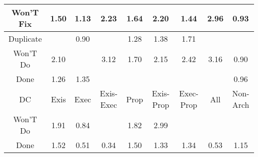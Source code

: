 \begin{tabular}{|c||c|c|c|c|c|c|c|c|}
\hline
Won'T Fix & \cellcolor[rgb]{0.8626152040378293,0.8175545703337086,0.42} 1.50 & \cellcolor[rgb]{0.8981264716371543,0.8343756970912837,0.42} 1.13 & \cellcolor[rgb]{0.7937341506108371,0.7849267029209228,0.42} 2.23 & \cellcolor[rgb]{0.8497795487605757,0.8114745230971148,0.42} 1.64 & \cellcolor[rgb]{0.7970508160686863,0.786497754979904,0.42} 2.20 & \cellcolor[rgb]{0.8685412676959272,0.8203616531191233,0.42} 1.44 & \cellcolor[rgb]{0.7251477189017987,0.75243839316401,0.42} 2.96 & \cellcolor[rgb]{0.8982838036636152,0.784543337341111,0.409064883419374} 0.93 \\ 
\hline
Duplicate &  & \cellcolor[rgb]{0.893262899184106,0.7607777228047677,0.40437870590516545} 0.90 &  & \cellcolor[rgb]{0.8832128190959656,0.8273113353612468,0.42} 1.28 & \cellcolor[rgb]{0.8737400008040134,0.8228242109071642,0.42} 1.38 & \cellcolor[rgb]{0.8427819699847852,0.8081598805191088,0.42000000000000004} 1.71 &  &  \\ 
\hline
Won'T Do & \cellcolor[rgb]{0.8064286249806552,0.7909398749908367,0.42000000000000004} 2.10 &  & \cellcolor[rgb]{0.7100272230802143,0.7452760530379963,0.42} 3.12 & \cellcolor[rgb]{0.8439091895400868,0.8086938266242516,0.42000000000000004} 1.70 & \cellcolor[rgb]{0.8016442509726989,0.7886735925660152,0.42} 2.15 & \cellcolor[rgb]{0.7765159175343297,0.7767706977794193,0.42} 2.42 & \cellcolor[rgb]{0.7062637894664907,0.7434933739578115,0.42} 3.16 & \cellcolor[rgb]{0.8922021409077528,0.7557568002966969,0.403388664847236} 0.90 \\ 
\hline
Done & \cellcolor[rgb]{0.8856098013123442,0.8284467479900577,0.42} 1.26 & \cellcolor[rgb]{0.876859469799226,0.8243018541154228,0.42} 1.35 &  &  &  &  &  & \cellcolor[rgb]{0.902413659632982,0.8040913222627818,0.41291941565744994} 0.96 \\ 
\hline
\hline
DC & Exis & Exec & Exis-Exec & Prop & Exis-Prop & Exec-Prop & All & Non-Arch \\ 
\hline
Won'T Do & \cellcolor[rgb]{0.8244058875115728,0.7994554204002188,0.42} 1.91 & \cellcolor[rgb]{0.8815205462696023,0.7051972523427839,0.3934191765182954} 0.84 &  & \cellcolor[rgb]{0.8325243302209373,0.8033009985257071,0.42000000000000004} 1.82 & \cellcolor[rgb]{0.7220792864300742,0.7509849251510878,0.42} 2.99 &  &  &  \\ 
\hline
Done & \cellcolor[rgb]{0.8610593907620143,0.8168176061504278,0.41999999999999993} 1.52 & \cellcolor[rgb]{0.8232509672205564,0.42938791151063327,0.33903423607251926} 0.51 & \cellcolor[rgb]{0.7951249201596673,0.29625795542242506,0.31278325881568947} 0.34 & \cellcolor[rgb]{0.8630568900253672,0.8177637900120159,0.42} 1.50 & \cellcolor[rgb]{0.8786135005639888,0.8251327107934684,0.42} 1.33 & \cellcolor[rgb]{0.8780558135209318,0.8248685432467571,0.42} 1.34 & \cellcolor[rgb]{0.8270757989775462,0.44749211516038545,0.34260407904570983} 0.53 & \cellcolor[rgb]{0.8955418182788718,0.8331513876057813,0.42} 1.15 \\ 

\end{tabular}
